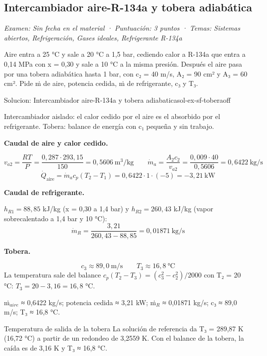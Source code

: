 \documentclass[11pt,a4paper]{article}
\begin{document}
\subsection{Intercambiador aire-R-134a y tobera adiabática}
\noindent\textit{Examen: Sin fecha en el material · Puntuación: 3 puntos · Temas: Sistemas abiertos, Refrigeración, Gases ideales, Refrigerante R-134a}\par\medskip

Aire entra a 25 °C y sale a 20 °C a 1,5 bar, cediendo calor a R-134a que entra a 0,14 MPa con x = 0,30 y sale a 10 °C a la misma presión. Después el aire pasa por una tobera adiabática hasta 1 bar, con c₂ = 40 m/s, A₂ = 90 cm² y A₃ = 60 cm². Pide ṁ de aire, potencia cedida, ṁ de refrigerante, c₃ y T₃.

\begin{ocg}{Solucion: Intercambiador aire-R-134a y tobera adiabatica}{sol-ex-sf-tobera}{off}
\begin{antesbox}
Intercambiador aislado: el calor cedido por el aire es el absorbido por el refrigerante. Tobera: balance de energía con c₁ pequeña y sin trabajo.
\end{antesbox}

\par\medskip\noindent\textbf{Caudal de aire y calor cedido.}\par
\[v_{a2} = \frac{RT}{P} = \frac{0{,}287\cdot 293{,}15}{150} = 0{,}5606\ \text{m}^3/\text{kg} \qquad \dot m_a = \frac{A_2c_2}{v_{a2}} = \frac{0{,}009\cdot 40}{0{,}5606} = 0{,}6422\ \text{kg/s}\]   \[\dot Q_{\text{aire}} = \dot m_a c_p (T_2 - T_1) = 0{,}6422\cdot 1\cdot(-5) = -3{,}21\ \text{kW}\]

\par\medskip\noindent\textbf{Caudal de refrigerante.}\par
$h_{R1} = 88{,}85$  kJ/kg (x = 0,30 a 1,4 bar) y  $h_{R2} = 260{,}43$  kJ/kg (vapor sobrecalentado a 1,4 bar y 10 °C):  \[\dot m_R = \frac{3{,}21}{260{,}43 - 88{,}85} = 0{,}01871\ \text{kg/s}\]

\par\medskip\noindent\textbf{Tobera.}\par
\[c_3 \approx 89{,}0\ \text{m/s} \qquad T_3 \approx 16{,}8\ \text{°C}\]  La temperatura sale del balance  $c_p(T_2 - T_3) = (c_3^2 - c_2^2)/2000$  con T₂ = 20 °C:  $T_3 = 20 - 3{,}16 = 16{,}8$  °C.

\begin{resbox}
ṁ$_{aire}$ ≈ 0,6422 kg/s; potencia cedida ≈ 3,21 kW; ṁ$_{R}$ ≈ 0,01871 kg/s; c₃ ≈ 89,0 m/s; T₃ ≈ 16,8 °C.
\end{resbox}

\begin{ojobox}{Temperatura de salida de la tobera}
La solución de referencia da T₃ = 289,87 K (16,72 °C) a partir de un redondeo de 3,2559 K. Con el balance de la tobera, la caída es de 3,16 K y T₃ ≈ 16,8 °C.
\end{ojobox}

\hspace{0pt}\end{ocg}
\end{document}
